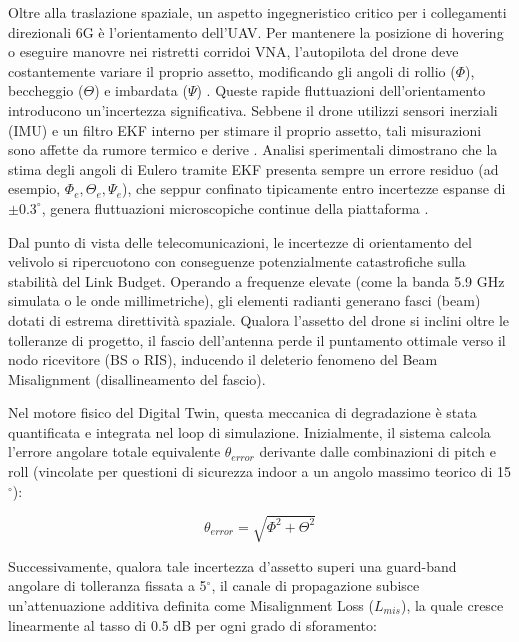 \documentclass[twoside]{article}
\begin{document}
Oltre alla traslazione spaziale, un aspetto ingegneristico critico per i collegamenti direzionali 6G è l'orientamento dell'UAV. Per mantenere la posizione di hovering o eseguire manovre nei ristretti corridoi VNA, l'autopilota del drone deve costantemente variare il proprio assetto, modificando gli angoli di rollio ($\Phi$), beccheggio ($\Theta$) e imbardata ($\Psi$) \cite{Muller2024}. Queste rapide fluttuazioni dell'orientamento introducono un'incertezza significativa. Sebbene il drone utilizzi sensori inerziali (IMU) e un filtro EKF interno per stimare il proprio assetto, tali misurazioni sono affette da rumore termico e derive \cite{Muller2024}. Analisi sperimentali dimostrano che la stima degli angoli di Eulero tramite EKF presenta sempre un errore residuo (ad esempio, $\Phi_e, \Theta_e, \Psi_e$), che seppur confinato tipicamente entro incertezze espanse di $\pm0.3^\circ$, genera fluttuazioni microscopiche continue della piattaforma \cite{Muller2024}.

Dal punto di vista delle telecomunicazioni, le incertezze di orientamento del velivolo si ripercuotono con conseguenze potenzialmente catastrofiche sulla stabilità del Link Budget. Operando a frequenze elevate (come la banda 5.9 GHz simulata o le onde millimetriche), gli elementi radianti generano fasci (beam) dotati di estrema direttività spaziale. Qualora l'assetto del drone si inclini oltre le tolleranze di progetto, il fascio dell'antenna perde il puntamento ottimale verso il nodo ricevitore (BS o RIS), inducendo il deleterio fenomeno del Beam Misalignment (disallineamento del fascio).

Nel motore fisico del Digital Twin, questa meccanica di degradazione è stata quantificata e integrata nel loop di simulazione. Inizialmente, il sistema calcola l'errore angolare totale equivalente $\theta_{error}$ derivante dalle combinazioni di pitch e roll (vincolate per questioni di sicurezza indoor a un angolo massimo teorico di 15$^\circ$):

\begin{equation}
\theta_{error} = \sqrt{\Phi^2 + \Theta^2}
\label{eq:beam_angular_error}
\end{equation}

Successivamente, qualora tale incertezza d'assetto superi una guard-band angolare di tolleranza fissata a 5$^\circ$, il canale di propagazione subisce un'attenuazione additiva definita come Misalignment Loss ($L_{mis}$), la quale cresce linearmente al tasso di 0.5 dB per ogni grado di sforamento:
\end{document}
